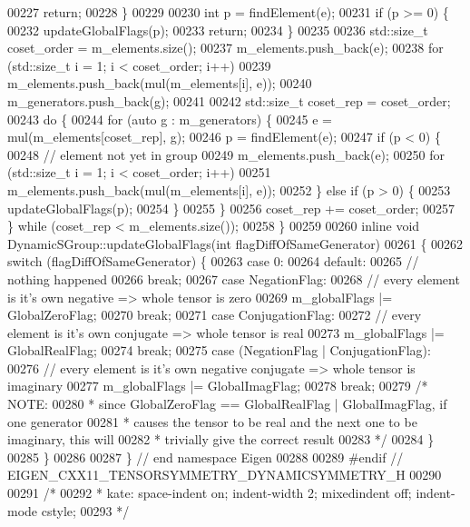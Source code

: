 \begin{DoxyCode}
00227     \textcolor{keywordflow}{return};
00228   \}
00229 
00230   \textcolor{keywordtype}{int} p = findElement(e);
00231   \textcolor{keywordflow}{if} (p >= 0) \{
00232     updateGlobalFlags(p);
00233     \textcolor{keywordflow}{return};
00234   \}
00235 
00236   std::size\_t coset\_order = m\_elements.size();
00237   m\_elements.push\_back(e);
00238   \textcolor{keywordflow}{for} (std::size\_t i = 1; i < coset\_order; i++)
00239     m\_elements.push\_back(mul(m\_elements[i], e));
00240   m\_generators.push\_back(g);
00241 
00242   std::size\_t coset\_rep = coset\_order;
00243   \textcolor{keywordflow}{do} \{
00244     \textcolor{keywordflow}{for} (\textcolor{keyword}{auto} g : m\_generators) \{
00245       e = mul(m\_elements[coset\_rep], g);
00246       p = findElement(e);
00247       \textcolor{keywordflow}{if} (p < 0) \{
00248         \textcolor{comment}{// element not yet in group}
00249         m\_elements.push\_back(e);
00250         \textcolor{keywordflow}{for} (std::size\_t i = 1; i < coset\_order; i++)
00251           m\_elements.push\_back(mul(m\_elements[i], e));
00252       \} \textcolor{keywordflow}{else} \textcolor{keywordflow}{if} (p > 0) \{
00253         updateGlobalFlags(p);
00254       \}
00255     \}
00256     coset\_rep += coset\_order;
00257   \} \textcolor{keywordflow}{while} (coset\_rep < m\_elements.size());
00258 \}
00259 
00260 \textcolor{keyword}{inline} \textcolor{keywordtype}{void} DynamicSGroup::updateGlobalFlags(\textcolor{keywordtype}{int} flagDiffOfSameGenerator)
00261 \{
00262     \textcolor{keywordflow}{switch} (flagDiffOfSameGenerator) \{
00263       \textcolor{keywordflow}{case} 0:
00264       \textcolor{keywordflow}{default}:
00265         \textcolor{comment}{// nothing happened}
00266         \textcolor{keywordflow}{break};
00267       \textcolor{keywordflow}{case} NegationFlag:
00268         \textcolor{comment}{// every element is it's own negative => whole tensor is zero}
00269         m\_globalFlags |= GlobalZeroFlag;
00270         \textcolor{keywordflow}{break};
00271       \textcolor{keywordflow}{case} ConjugationFlag:
00272         \textcolor{comment}{// every element is it's own conjugate => whole tensor is real}
00273         m\_globalFlags |= GlobalRealFlag;
00274         \textcolor{keywordflow}{break};
00275       \textcolor{keywordflow}{case} (NegationFlag | ConjugationFlag):
00276         \textcolor{comment}{// every element is it's own negative conjugate => whole tensor is imaginary}
00277         m\_globalFlags |= GlobalImagFlag;
00278         \textcolor{keywordflow}{break};
00279       \textcolor{comment}{/* NOTE:}
00280 \textcolor{comment}{       *   since GlobalZeroFlag == GlobalRealFlag | GlobalImagFlag, if one generator}
00281 \textcolor{comment}{       *   causes the tensor to be real and the next one to be imaginary, this will}
00282 \textcolor{comment}{       *   trivially give the correct result}
00283 \textcolor{comment}{       */}
00284     \}
00285 \}
00286 
00287 \} \textcolor{comment}{// end namespace Eigen}
00288 
00289 \textcolor{preprocessor}{#endif // EIGEN\_CXX11\_TENSORSYMMETRY\_DYNAMICSYMMETRY\_H}
00290 
00291 \textcolor{comment}{/*}
00292 \textcolor{comment}{ * kate: space-indent on; indent-width 2; mixedindent off; indent-mode cstyle;}
00293 \textcolor{comment}{ */}
\end{DoxyCode}
